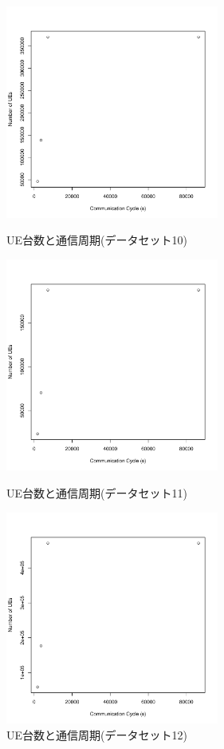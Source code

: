 \documentclass[a4j]{ujarticle}
\begin{document}
\begin{figure}[htbp]
 \begin{minipage}{0.5\hsize}
  \begin{center}
   \includegraphics[width=70mm]{UE_cycle_dataset10.pdf}
  \end{center}
  \caption{UE台数と通信周期(データセット10)}
  \label{UE_cycle_dataset10}
 \end{minipage}
 \begin{minipage}{0.5\hsize}
 \begin{center}
  \includegraphics[width=70mm]{UE_cycle_dataset11.pdf}
 \end{center}
  \caption{UE台数と通信周期(データセット11)}
  \label{UE_cycle_dataset11}
 \end{minipage}
 \begin{minipage}{0.5\hsize}
 \begin{center}
  \includegraphics[width=70mm]{UE_cycle_dataset12.pdf}
 \end{center}
  \caption{UE台数と通信周期(データセット12)}
  \label{UE_cycle_dataset12}
 \end{minipage}
\end{figure}
\end{document}
